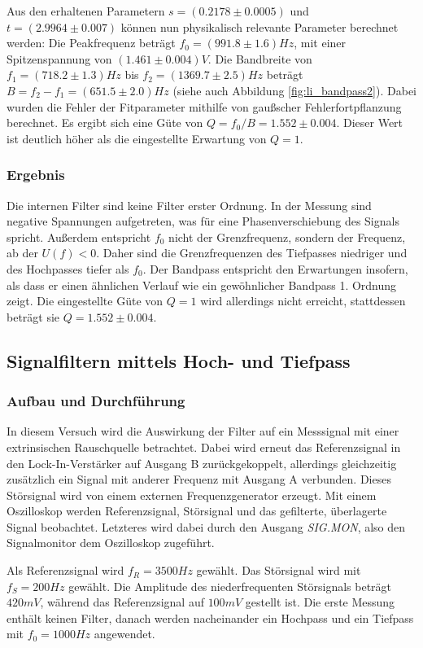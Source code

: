 \documentclass{../Misc/MontavonLaTeX/Montavon}
\begin{document}
Aus den erhaltenen Parametern $s = (0.2178 \pm 0.0005)$ und $t = (2.9964 \pm 0.007)$ können nun physikalisch relevante Parameter berechnet werden:
Die Peakfrequenz beträgt $f_0 = (991.8 \pm 1.6) \unit{Hz}$, mit einer Spitzenspannung von $(1.461 \pm 0.004) \unit{V}$. Die Bandbreite von $f_1 = (718.2 \pm 1.3) \unit{Hz}$ bis $f_2 = (1369.7 \pm 2.5) \unit{Hz}$ beträgt $B = f_2 - f_1 = (651.5 \pm 2.0) \unit{Hz}$ (siehe auch Abbildung \ref{fig:li_bandpass2}). Dabei wurden die Fehler der Fitparameter mithilfe von gaußscher Fehlerfortpflanzung berechnet. 
Es ergibt sich eine Güte von $Q = f_0 / B = 1.552 \pm 0.004$. Dieser Wert ist deutlich höher als die eingestellte Erwartung von $Q = 1$.

\subsubsection{Ergebnis}
Die internen Filter sind keine Filter erster Ordnung. In der Messung sind negative Spannungen aufgetreten, was für eine Phasenverschiebung des Signals spricht. Außerdem entspricht $f_0$ nicht der Grenzfrequenz, sondern der Frequenz, ab der $U(f) < 0$. Daher sind die Grenzfrequenzen des Tiefpasses niedriger und des Hochpasses tiefer als $f_0$.
Der Bandpass entspricht den Erwartungen insofern, als dass er einen ähnlichen Verlauf wie ein gewöhnlicher Bandpass 1. Ordnung zeigt. Die eingestellte Güte  von $Q = 1$ wird allerdings nicht erreicht, stattdessen beträgt sie $Q = 1.552 \pm 0.004$.

\subsection{Signalfiltern mittels Hoch- und Tiefpass}
\subsubsection{Aufbau und Durchführung}
In diesem Versuch wird die Auswirkung der Filter auf ein Messsignal mit einer  extrinsischen Rauschquelle betrachtet. Dabei wird erneut das Referenzsignal in den Lock-In-Verstärker auf Ausgang B zurückgekoppelt, allerdings gleichzeitig zusätzlich ein Signal mit anderer Frequenz mit Ausgang A verbunden. Dieses Störsignal wird von einem externen Frequenzgenerator erzeugt. 
Mit einem Oszilloskop werden Referenzsignal, Störsignal und das gefilterte, überlagerte Signal beobachtet. Letzteres wird dabei durch den Ausgang \emph{SIG.MON}, also den Signalmonitor dem Oszilloskop zugeführt.

Als Referenzsignal wird $f_R = 3500 \unit{Hz}$ gewählt. Das Störsignal wird mit $f_S = 200 \unit{Hz}$ gewählt. Die Amplitude des niederfrequenten Störsignals beträgt $420 \unit{mV}$, während das Referenzsignal auf $100 \unit{mV}$ gestellt ist.
Die erste Messung enthält keinen Filter, danach werden nacheinander ein Hochpass und ein Tiefpass mit $f_0 = 1000 \unit{Hz}$ angewendet.
\end{document}
